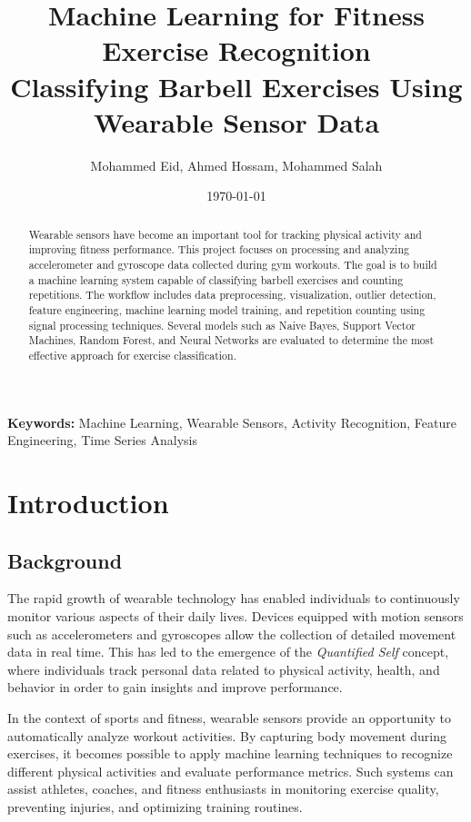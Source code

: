 \documentclass[12pt,a4paper]{article}
\title{\textbf{Machine Learning for Fitness Exercise Recognition}\\
\vspace{0.5cm}
\large Classifying Barbell Exercises Using Wearable Sensor Data}
\author{
Mohammed Eid, Ahmed Hossam, Mohammed Salah
}
\date{\today}
\begin{document}
\maketitle

\begin{abstract}
Wearable sensors have become an important tool for tracking physical activity and improving fitness performance. This project focuses on processing and analyzing accelerometer and gyroscope data collected during gym workouts. The goal is to build a machine learning system capable of classifying barbell exercises and counting repetitions. The workflow includes data preprocessing, visualization, outlier detection, feature engineering, machine learning model training, and repetition counting using signal processing techniques. Several models such as Naive Bayes, Support Vector Machines, Random Forest, and Neural Networks are evaluated to determine the most effective approach for exercise classification.
\end{abstract}

\textbf{Keywords:} Machine Learning, Wearable Sensors, Activity Recognition, Feature Engineering, Time Series Analysis

\newpage
\tableofcontents
\newpage

\section{Introduction}

\subsection{Background}

The rapid growth of wearable technology has enabled individuals to continuously monitor various aspects of their daily lives. Devices equipped with motion sensors such as accelerometers and gyroscopes allow the collection of detailed movement data in real time. This has led to the emergence of the \textit{Quantified Self} concept, where individuals track personal data related to physical activity, health, and behavior in order to gain insights and improve performance.

In the context of sports and fitness, wearable sensors provide an opportunity to automatically analyze workout activities. By capturing body movement during exercises, it becomes possible to apply machine learning techniques to recognize different physical activities and evaluate performance metrics. Such systems can assist athletes, coaches, and fitness enthusiasts in monitoring exercise quality, preventing injuries, and optimizing training routines.
\end{document}
